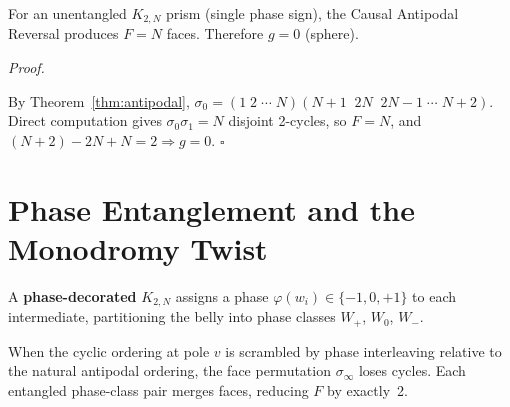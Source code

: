 \documentclass[11pt, a4paper, openany]{book}
\newcounter{thm}[chapter]
\renewenvironment{proof}[1][Proof]{%
  \par\noindent\textit{#1.}\quad
}{\hfill$\square$\par\medskip}
\begin{document}
\begin{corollary}\label{cor:gen1-sphere}
For an unentangled $K_{2,N}$ prism (single phase sign), the Causal Antipodal Reversal produces $F = N$ faces. Therefore $g = 0$ (sphere).
\end{corollary}

\begin{proof}
By Theorem~\ref{thm:antipodal}, $\sigma_0 = (1\;2\;\cdots\;N)(N{+}1\;\;2N\;\;2N{-}1\;\cdots\;N{+}2)$. Direct computation gives $\sigma_0\sigma_1 = N$ disjoint 2-cycles, so $F = N$, and $(N+2) - 2N + N = 2 \Rightarrow g = 0$.
\end{proof}

\section{Phase Entanglement and the Monodromy Twist}\label{sec:monodromy}

\begin{definition}\label{def:phase-decorated}
A \textbf{phase-decorated} $K_{2,N}$ assigns a phase $\varphi(w_i) \in \{-1, 0, +1\}$ to each intermediate, partitioning the belly into phase classes $W_+$, $W_0$, $W_-$.
\end{definition}

\begin{theorem}\label{thm:monodromy}
When the cyclic ordering at pole $v$ is scrambled by phase interleaving relative to the natural antipodal ordering, the face permutation $\sigma_\infty$ loses cycles. Each entangled phase-class pair merges faces, reducing $F$ by exactly~2.
\end{theorem}
\end{document}
